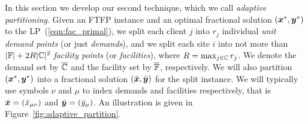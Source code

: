\documentclass[oneside,final]{ucr}
\begin{document}
In this section we develop our second technique, which we
call \emph{adaptive partitioning}. Given an FTFP instance
and an optimal fractional solution $(\boldsymbol{x}^\ast, \boldsymbol{y}^\ast)$
to the LP~(\ref{eqn:fac_primal}), we split each client $j$
into $r_j$ individual \emph{unit demand points} (or just
\emph{demands}), and we split each site $i$ into not more
than $|\mathbb{F}|+2R|\mathbb{C}|^2$ \emph{facility points}
(or \emph{facilities}), where
$R=\max_{j\in\mathbb{C}}r_j$. We denote the demand set by
$\overline{\mathbb{C}}$ and the facility set by $\overline{\mathbb{F}}$,
respectively.  We will also partition
$(\boldsymbol{x}^\ast,\boldsymbol{y}^\ast)$ into a fractional solution
$(\bar{\boldsymbol{x}},\bar{\boldsymbol{y}})$ for the split instance.  We will
typically use symbols $\nu$ and $\mu$ to index demands and
facilities respectively, that is $\bar{\boldsymbol{x}} =
({\bar x}_{\mu\nu})$ and $\bar{\boldsymbol{y}} = ({\bar y}_{\mu})$. An
illustration is given in
Figure~\ref{fig:adaptive_partition}.
\end{document}
